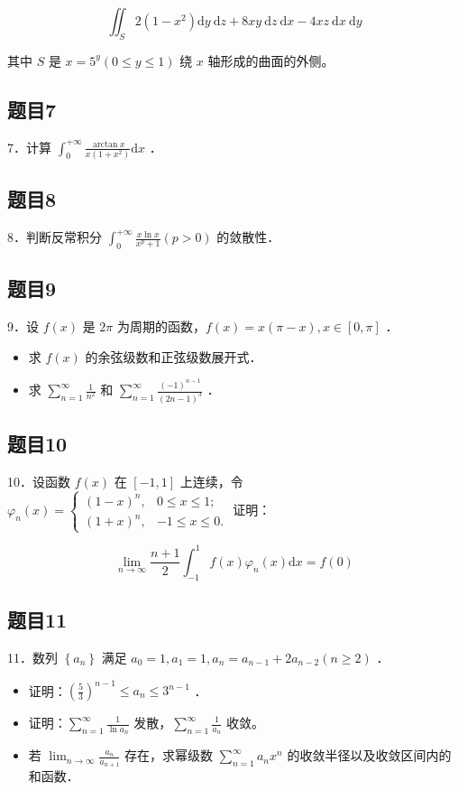 \documentclass{article}
\begin{document}
\[
\iint_{S} 2\left(1-x^{2}\right) \mathrm{d} y \mathrm{~d} z+8 x y \mathrm{~d} z \mathrm{~d} x-4 x z \mathrm{~d} x \mathrm{~d} y
\]

其中 \(S\) 是 \(x=5^{y}(0 \leq y \leq 1)\) 绕 \(x\) 轴形成的曲面的外侧。

\subsection{题目7}
7．计算 \(\int_{0}^{+\infty} \frac{\arctan x}{x\left(1+x^{2}\right)} \mathrm{d} x\) ．

\subsection{题目8}
8．判断反常积分 \(\int_{0}^{+\infty} \frac{x \ln x}{x^{p}+1}(p>0)\) 的敛散性．

\subsection{题目9}
9．设 \(f(x)\) 是 \(2 \pi\) 为周期的函数，\(f(x)=x(\pi-x), x \in[0, \pi]\) ．

\begin{itemize}
  \item[（1）] 求 \(f(x)\) 的余弦级数和正弦级数展开式．
  \item[（2）] 求 \(\sum_{n=1}^{\infty} \frac{1}{n^{2}}\) 和 \(\sum_{n=1}^{\infty} \frac{(-1)^{n-1}}{(2 n-1)^{3}}\) ．
\end{itemize}

\subsection{题目10}
10．设函数 \(f(x)\) 在 \([-1,1]\) 上连续，令 \(\varphi_{n}(x)=\left\{\begin{array}{ll}(1-x)^{n}, & 0 \leq x \leq 1 ; \\ (1+x)^{n}, & -1 \leq x \leq 0 .\end{array}\right.\) 证明：

\[
\lim _{n \rightarrow \infty} \frac{n+1}{2} \int_{-1}^{1} f(x) \varphi_{n}(x) \mathrm{d} x=f(0)
\]

\subsection{题目11}
11．数列 \(\left\{a_{n}\right\}\) 满足 \(a_{0}=1, a_{1}=1, a_{n}=a_{n-1}+2 a_{n-2}(n \geq 2)\) ．

\begin{itemize}
  \item[（1）] 证明：\(\left(\frac{5}{3}\right)^{n-1} \leq a_{n} \leq 3^{n-1}\) ．
  \item[（2）] 证明：\(\sum_{n=1}^{\infty} \frac{1}{\ln a_{n}}\) 发散，\(\sum_{n=1}^{\infty} \frac{1}{a_{n}}\) 收敛。
  \item[（3）] 若 \(\lim _{n \rightarrow \infty} \frac{a_{n}}{a_{n+1}}\) 存在，求幂级数 \(\sum_{n=1}^{\infty} a_{n} x^{n}\) 的收敛半径以及收敛区间内的和函数．
\end{itemize}
\end{document}
